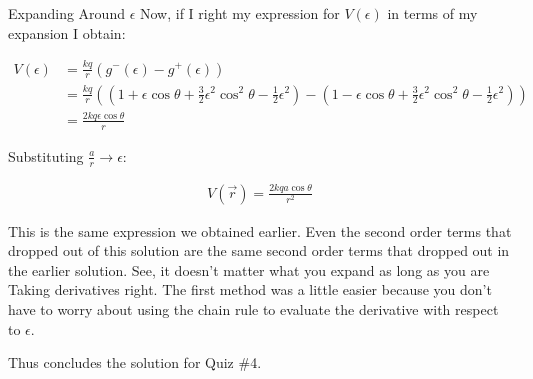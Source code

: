 \begin{homeworkProblem}[Quiz 4]
\begin{homeworkSection}{Expanding Around $\epsilon$}
    Now, if I right my expression for $V(\epsilon)$ in terms of my
    expansion I obtain:

    \begin{align}
        V(\epsilon) &= \frac{k q}{r}\left( g^-(\epsilon) -
        g^+(\epsilon) \right) \nonumber \\
        &= \frac{kq}{r}\left( 
            \left(
            1 + \epsilon \cos\theta + \frac{3}{2}\epsilon^2\cos^2\theta 
            -\frac{1}{2}\epsilon^2
            \right)
            - \left(
            1 - \epsilon \cos\theta + \frac{3}{2}\epsilon^2\cos^2\theta
            -\frac{1}{2}\epsilon^2
            \right)
        \right) \nonumber \\
        &= \frac{2kq\epsilon\cos\theta}{r} \nonumber
    \end{align}

    Substituting $\frac{a}{r} \rightarrow \epsilon$:
    
    \begin{align}
        \label{}
        V(\vec{r})= \frac{2kqa\cos\theta}{r^2} \nonumber
    \end{align}
    
    This is the same expression we obtained earlier. Even the second
    order terms that dropped out of this solution are the same second
    order terms that dropped out in the earlier solution. See, it
    doesn't matter what you expand as long as you are Taking derivatives
    right.  The first method was a little easier because you don't have
    to worry about using the chain rule to evaluate the derivative with
    respect to $\epsilon$.
    
    Thus concludes the solution for Quiz \#4.
\end{homeworkSection}
\end{homeworkProblem}

